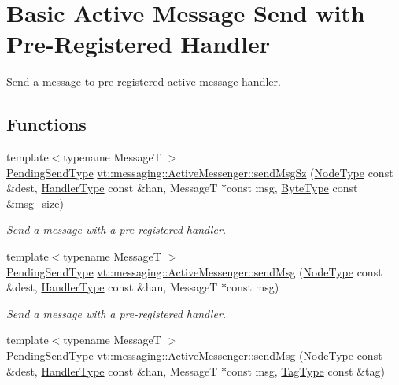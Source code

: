 \hypertarget{group__preregister}{}\section{Basic Active Message Send with Pre-\/\+Registered Handler}
\label{group__preregister}


Send a message to pre-\/registered active message handler.  


\subsection*{Functions}
\begin{DoxyCompactItemize}
\item 
{\footnotesize template$<$typename MessageT $>$ }\\\hyperlink{structvt_1_1messaging_1_1_active_messenger_a3626a6ca76d8ad4ec7c3b47a2c70d3a8}{Pending\+Send\+Type} \hyperlink{group__preregister_gaaa9d337aea172f7ae94113da04d96128}{vt\+::messaging\+::\+Active\+Messenger\+::send\+Msg\+Sz} (\hyperlink{namespacevt_a866da9d0efc19c0a1ce79e9e492f47e2}{Node\+Type} const \&dest, \hyperlink{namespacevt_af64846b57dfcaf104da3ef6967917573}{Handler\+Type} const \&han, MessageT $\ast$const msg, \hyperlink{namespacevt_aab8d55968084610ce3b17057981e9300}{Byte\+Type} const \&msg\+\_\+size)
\begin{DoxyCompactList}\small\item\em Send a message with a pre-\/registered handler. \end{DoxyCompactList}\item 
{\footnotesize template$<$typename MessageT $>$ }\\\hyperlink{structvt_1_1messaging_1_1_active_messenger_a3626a6ca76d8ad4ec7c3b47a2c70d3a8}{Pending\+Send\+Type} \hyperlink{group__preregister_ga55c6ea91181ae20c681e73a356750916}{vt\+::messaging\+::\+Active\+Messenger\+::send\+Msg} (\hyperlink{namespacevt_a866da9d0efc19c0a1ce79e9e492f47e2}{Node\+Type} const \&dest, \hyperlink{namespacevt_af64846b57dfcaf104da3ef6967917573}{Handler\+Type} const \&han, MessageT $\ast$const msg)
\begin{DoxyCompactList}\small\item\em Send a message with a pre-\/registered handler. \end{DoxyCompactList}\item 
{\footnotesize template$<$typename MessageT $>$ }\\\hyperlink{structvt_1_1messaging_1_1_active_messenger_a3626a6ca76d8ad4ec7c3b47a2c70d3a8}{Pending\+Send\+Type} \hyperlink{group__preregister_ga93893f5f092a2444f652fd25f37eb7d0}{vt\+::messaging\+::\+Active\+Messenger\+::send\+Msg} (\hyperlink{namespacevt_a866da9d0efc19c0a1ce79e9e492f47e2}{Node\+Type} const \&dest, \hyperlink{namespacevt_af64846b57dfcaf104da3ef6967917573}{Handler\+Type} const \&han, MessageT $\ast$const msg, \hyperlink{namespacevt_a84ab281dae04a52a4b243d6bf62d0e52}{Tag\+Type} const \&tag)

\end{DoxyCompactItemize}
